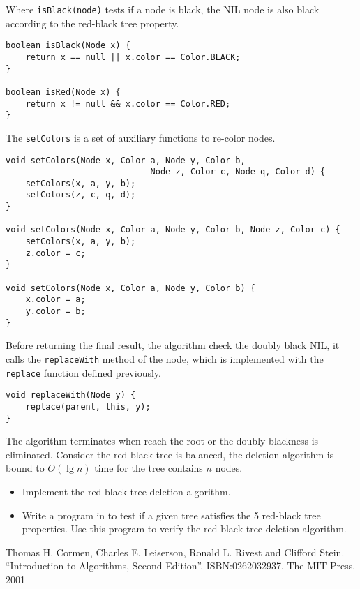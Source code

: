 \documentclass[UTF8]{article}
\begin{document}
Where \texttt{isBlack(node)} tests if a node is black, the NIL node is also black according to the red-black tree property.

\begin{lstlisting}
boolean isBlack(Node x) {
    return x == null || x.color == Color.BLACK;
}

boolean isRed(Node x) {
    return x != null && x.color == Color.RED;
}
\end{lstlisting}

The \texttt{setColors} is a set of auxiliary functions to re-color nodes.

\begin{lstlisting}
void setColors(Node x, Color a, Node y, Color b,
                             Node z, Color c, Node q, Color d) {
    setColors(x, a, y, b);
    setColors(z, c, q, d);
}

void setColors(Node x, Color a, Node y, Color b, Node z, Color c) {
    setColors(x, a, y, b);
    z.color = c;
}

void setColors(Node x, Color a, Node y, Color b) {
    x.color = a;
    y.color = b;
}
\end{lstlisting}

Before returning the final result, the algorithm check the doubly black NIL, it calls the \texttt{replaceWith} method of the node, which is implemented with the \texttt{replace} function defined previously.

\begin{lstlisting}
void replaceWith(Node y) {
    replace(parent, this, y);
}
\end{lstlisting}

The algorithm terminates when reach the root or the doubly blackness is eliminated. Consider the red-black tree is balanced, the deletion algorithm is bound to $O(\lg n)$ time for the tree contains $n$ nodes.

\begin{Exercise}

\begin{itemize}
\item Implement the red-black tree deletion algorithm.
\item Write a program in to test if a given tree satisfies the 5 red-black tree properties. Use this program to verify the red-black tree deletion algorithm.
\end{itemize}

\end{Exercise}

\ifx\wholebook\relax \else
\begin{thebibliography}{99}

Thomas H. Cormen, Charles E. Leiserson, Ronald L. Rivest and Clifford Stein.
``Introduction to Algorithms, Second Edition''. ISBN:0262032937. The MIT Press. 2001

\end{thebibliography}
\end{document}
